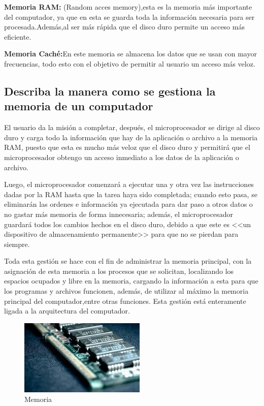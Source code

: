 \documentclass{article}
\begin{document}
\textbf{Memoria RAM:} (Random acces memory),esta es la memoria más importante del computador, ya que en esta se guarda toda la información necesaria para ser procesada.Además,al ser más rápida que el disco duro permite un acceso más eficiente.\par

\textbf{Memoria Caché:}En este memoria se almacena los datos que se usan con mayor frecuencias, todo esto con el objetivo de permitir al usuario un acceso más veloz.\par

\subsection{Describa la manera como se gestiona la memoria de un computador}\par
El usuario da la misión a completar, después, el microprocesador se dirige al disco duro y carga todo la información que hay de la aplicación o archivo a la memoria RAM, puesto que esta es mucho más veloz que el disco duro y permitirá que el microprocesador obtengo un acceso inmediato a los datos de la aplicación o archivo.\par
Luego, el microprocesador comenzará a ejecutar una y otra vez las instrucciones dadas por la RAM hasta que la tarea haya sido completada; cuando esto pasa, se eliminarán las ordenes e información ya ejecutada para dar paso a otros datos o no gastar más memoria de forma innecesaria; además, el microprocesador guardará todos los cambios hechos en el disco duro, debido a que este es <<un dispositivo de almacenamiento permanente>> \cite{Salazar} para que no se pierdan para siempre.\par
Toda esta gestión se hace con el fin de administrar la memoria principal, con la asignación de esta memoria a los procesos que se solicitan, localizando los espacios ocupados y libre en la memoria, cargando la información a esta para que los programas y archivos funcionen, además, de utilizar al máximo la memoria principal del computador,entre otras funciones. Esta gestión está enteramente ligada a la arquitectura del computador.\cite{Rosenberg}

\begin{figure}[h]
\includegraphics[width=6cm]{descarga.png}
\centering
\caption{Memoria\cite{Anonimo}}
\label{fig:cpplogo}
\end{figure}
\end{document}
